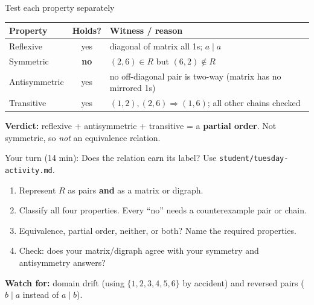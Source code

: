 \documentclass[aspectratio=169,10pt]{beamer}
\begin{document}
\begin{frame}{Test each property separately}
\begin{center}
\begin{tabular}{lcl}
\textbf{Property} & \textbf{Holds?} & \textbf{Witness / reason} \\\hline
Reflexive & yes & diagonal of matrix all 1s; $a\mid a$ \\
Symmetric & \textbf{no} & $(2,6)\in R$ but $(6,2)\notin R$ \\
Antisymmetric & yes & no off-diagonal pair is two-way (matrix has no mirrored 1s) \\
Transitive & yes & $(1,2),(2,6)\Rightarrow(1,6)$; all other chains checked \\
\end{tabular}
\end{center}
\vspace{4pt}
\textbf{Verdict:} reflexive + antisymmetric + transitive = a \textbf{partial order}. Not symmetric, so \emph{not} an equivalence relation.
\end{frame}

\begin{frame}{Your turn (14 min): Does the relation earn its label?}
Use \texttt{student/tuesday-activity.md}.
\begin{enumerate}
\item Represent $R$ as pairs \textbf{and} as a matrix or digraph.
\item Classify all four properties. Every ``no'' needs a counterexample pair or chain.
\item Equivalence, partial order, neither, or both? Name the required properties.
\item Check: does your matrix/digraph agree with your symmetry and antisymmetry answers?
\end{enumerate}
\textbf{Watch for:} domain drift (using $\{1,2,3,4,5,6\}$ by accident) and reversed pairs ($b\mid a$ instead of $a\mid b$).
\end{frame}
\end{document}
